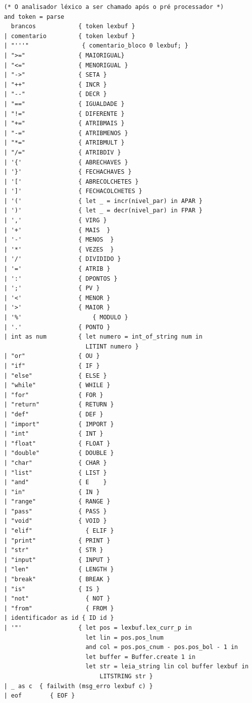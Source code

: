 \documentclass{article}
\begin{document}
\begin{lstlisting}
(* O analisador léxico a ser chamado após o pré processador *)
and token = parse
  brancos            { token lexbuf }
| comentario         { token lexbuf }
| "'''"               { comentario_bloco 0 lexbuf; }
| ">="               { MAIORIGUAL}
| "<="               { MENORIGUAL }
| "->"               { SETA }
| "++"               { INCR }
| "--"               { DECR }
| "=="               { IGUALDADE }
| "!="               { DIFERENTE }
| "+="               { ATRIBMAIS }
| "-="               { ATRIBMENOS }
| "*="               { ATRIBMULT }
| "/="               { ATRIBDIV }
| '{'                { ABRECHAVES }
| '}'                { FECHACHAVES }
| '['                { ABRECOLCHETES }
| ']'                { FECHACOLCHETES }
| '('                { let _ = incr(nivel_par) in APAR }
| ')'                { let _ = decr(nivel_par) in FPAR }
| ','                { VIRG }
| '+'                { MAIS  }
| '-'                { MENOS  }
| '*'                { VEZES  }
| '/'                { DIVIDIDO }
| '='                { ATRIB }
| ':'                { DPONTOS }
| ';'                { PV }
| '<'                { MENOR }
| '>'                { MAIOR }
| '%'		             { MODULO }
| '.'                { PONTO }
| int as num         { let numero = int_of_string num in
                       LITINT numero }                    
| "or"               { OU }
| "if"               { IF }
| "else"             { ELSE }
| "while"            { WHILE }
| "for"              { FOR }
| "return"           { RETURN }
| "def"              { DEF }
| "import"           { IMPORT }
| "int"              { INT }
| "float"            { FLOAT }
| "double"           { DOUBLE }
| "char"             { CHAR }
| "list"             { LIST }
| "and"              { E    }
| "in"               { IN }
| "range"            { RANGE }
| "pass"             { PASS }
| "void"             { VOID }
| "elif"	           { ELIF }
| "print"            { PRINT }
| "str"              { STR }
| "input"            { INPUT }
| "len"              { LENGTH }
| "break"            { BREAK }
| "is"               { IS }
| "not"		           { NOT }
| "from"	           { FROM }
| identificador as id { ID id }
| '"'                { let pos = lexbuf.lex_curr_p in
                       let lin = pos.pos_lnum
                       and col = pos.pos_cnum - pos.pos_bol - 1 in
                       let buffer = Buffer.create 1 in 
                       let str = leia_string lin col buffer lexbuf in
                           LITSTRING str }
| _ as c  { failwith (msg_erro lexbuf c) }
| eof        { EOF }




\end{lstlisting}
\end{document}
